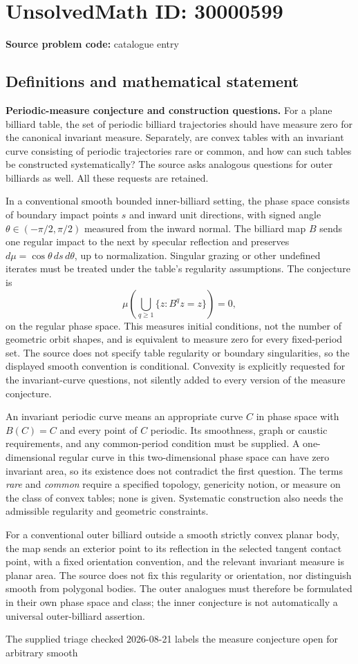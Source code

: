 \documentclass[11pt]{article}
\begin{document}
\section*{UnsolvedMath ID: 30000599}
\textbf{Source problem code:} catalogue entry
\subsection{Definitions and mathematical statement}
\textbf{Periodic-measure conjecture and construction questions.} For a plane billiard table, the set of periodic billiard trajectories should have measure zero for the canonical invariant measure. Separately, are convex tables with an invariant curve consisting of periodic trajectories rare or common, and how can such tables be constructed systematically? The source asks analogous questions for outer billiards as well. All these requests are retained.\par In a conventional smooth bounded inner-billiard setting, the phase space consists of boundary impact points \(s\) and inward unit directions, with signed angle \(\theta\in(-\pi/2,\pi/2)\) measured from the inward normal. The billiard map \(B\) sends one regular impact to the next by specular reflection and preserves \(d\mu=\cos\theta\,ds\,d\theta\), up to normalization. Singular grazing or other undefined iterates must be treated under the table's regularity assumptions. The conjecture is\[\mu\left(\bigcup_{q\ge1}\{z:B^qz=z\}\right)=0,\] on the regular phase space. This measures initial conditions, not the number of geometric orbit shapes, and is equivalent to measure zero for every fixed-period set. The source does not specify table regularity or boundary singularities, so the displayed smooth convention is conditional. Convexity is explicitly requested for the invariant-curve questions, not silently added to every version of the measure conjecture.\par An invariant periodic curve means an appropriate curve \(C\) in phase space with \(B(C)=C\) and every point of \(C\) periodic. Its smoothness, graph or caustic requirements, and any common-period condition must be supplied. A one-dimensional regular curve in this two-dimensional phase space can have zero invariant area, so its existence does not contradict the first question. The terms \emph{rare} and \emph{common} require a specified topology, genericity notion, or measure on the class of convex tables; none is given. Systematic construction also needs the admissible regularity and geometric constraints.\par For a conventional outer billiard outside a smooth strictly convex planar body, the map sends an exterior point to its reflection in the selected tangent contact point, with a fixed orientation convention, and the relevant invariant measure is planar area. The source does not fix this regularity or orientation, nor distinguish smooth from polygonal bodies. The outer analogues must therefore be formulated in their own phase space and class; the inner conjecture is not automatically a universal outer-billiard assertion.\par The supplied triage checked 2026-08-21 labels the measure conjecture open for arbitrary smooth 
\end{document}

